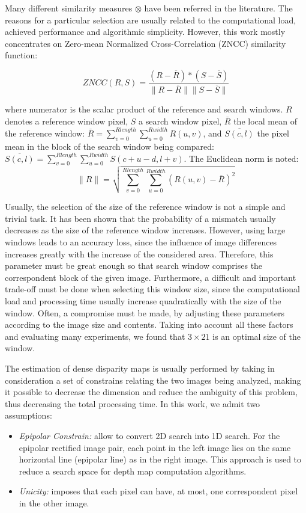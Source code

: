 \documentclass[conference]{IEEEtran}
\begin{document}
{Many different similarity measures $\otimes$ have been referred in the literature. The reasons for a particular selection are usually related to the computational load, achieved performance and algorithmic simplicity. However, this work mostly concentrates on Zero-mean Normalized Cross-Correlation (ZNCC) similarity function:

\begin{equation}\label{eq:zncc}
ZNCC(R,S)=\frac{\left(R-\overline{R}\right) * \left(S-\overline{S}\right)}{\|R-\overline{R}\| \|S-\overline{S}\|}
\end{equation}

where numerator is the scalar product of the reference and search windows. $R$ denotes a reference window pixel, $S$ a search window pixel, $\overline{R}$ the local mean of the reference window: $\overline{R}=\sum_{v=0}^{Rlength}\sum_{u=0}^{Rwidth}R\left(u,v\right)$, and $\overline{S\left(c,l\right)}$ the pixel mean in the block of the search window being compared: $\overline{S\left(c,l\right)}=\sum_{v=0}^{Rlength}\sum_{u=0}^{Rwidth}S\left(c+u-d,l+v\right)$. The Euclidean norm is noted:
\begin{equation}
\|R\| = \sqrt{\sum_{v=0}^{Rlength}\sum_{u=0}^{Rwidth}\left(R\left(u,v\right) - \overline{R}\right)^2}
\end{equation}

Usually, the selection of the size of the reference window is not a simple and trivial task. It has been shown that the probability of a mismatch usually decreases as the size of the reference window increases. However, using large windows leads to an accuracy loss, since the influence of image differences increases greatly with the increase of the considered area. Therefore, this parameter must be great enough so that search window comprises the correspondent block of the given image. Furthermore, a difficult and important trade-off must be done when selecting this window size, since the computational load and processing time usually increase quadratically with the size of the window. Often, a compromise must be made, by adjusting these parameters according to the image size and contents. Taking into account all these factors and evaluating many experiments, we found that $3 \times 21$ is an optimal size of the window.

The estimation of dense disparity maps is usually performed by taking in consideration a set of constrains relating the two images being analyzed, making it possible to decrease the dimension and reduce the ambiguity of this problem, thus decreasing the total processing time. In this work, we admit two assumptions:
\begin{itemize}
	\item \textit{Epipolar Constrain:} allow to convert 2D search into 1D search. For the epipolar rectified image pair, each point in the left image lies on the same horizontal line (epipolar line) as in the right image. This approach is used to reduce a search space for depth map computation algorithms.
	\item \textit{Unicity:} imposes that each pixel can have, at most, one correspondent pixel in the other image.
\end{itemize}

}
\end{document}
